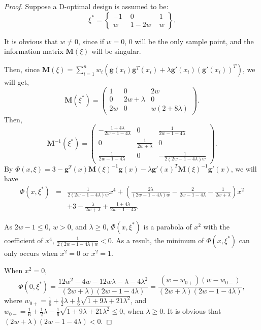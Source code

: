 \documentclass[preprint,12pt]{elsarticle}
\begin{document}
\begin{proof}
Suppose a D-optimal design is assumed to be:
$$\xi^*=\left\{\begin{array}{ccc}-1\,\,&0\,\,&1\\w\,\,&1-2w\,\,&w\end{array}\right\}.$$

It is obvious that $w\neq0$, since if $w=0$, $0$ will be the only
sample point, and the information matrix $\boldsymbol{M}(\xi)$ will
be singular.

Then, since
$\boldsymbol{M}(\xi)=\sum\limits_{i=1}^nw_i\left(\boldsymbol{g}(x_i)\boldsymbol{g}^T(x_i)+\lambda\boldsymbol{g}'(x_i)
\left(\boldsymbol{g}'(x_i)\right)^T\right)$, we will get,
$$\boldsymbol{M}(\xi^*)=\left(\begin{array}{ccc}1&0&2w\\0&2w+\lambda&0\\2w&0&w(2+8\lambda
)\end{array}\right).$$ Then,
$$\boldsymbol{M}^{-1}(\xi^*)=\left(\begin{array}{ccc}-\frac{1+4\lambda}{2w-1-4\lambda}&0&\frac{1}{2w-1-4\lambda}\\0&\frac{1}{2w+\lambda}&0\\\frac{1}{2w-1-4\lambda}&0&-\frac{1}{2(2w-1-4\lambda)w}\end{array}\right).$$
By
$\Phi(x,\xi)=3-\boldsymbol{g}^T(x)\boldsymbol{M}(\xi)^{-1}\boldsymbol{g}(x)-\lambda\boldsymbol{g}'(x)^T\boldsymbol{M}(\xi)^{-1}\boldsymbol{g}'(x)$,
we will have
\begin{eqnarray*}
\Phi(x,\xi^*)&=&\frac{1}{2(2w-1-4\lambda)w}x^4+\left(\frac{2\lambda}{(2w-1-4\lambda)w}-\frac{2}{2w-1-4\lambda}-\frac{1}{2w+\lambda}\right)x^2\\
&&+3-\frac{\lambda}{2w+\lambda}+\frac{1+4\lambda}{2w-1-4\lambda}.
\end{eqnarray*}

As $2w-1\leq0$, $w>0$, and $\lambda\geq0$, $\Phi(x,\xi^*)$ is a
parabola of $x^2$ with the coefficient of $x^4$,
$\frac{1}{2(2w-1-4\lambda)w}<0$. As a result, the minimum of
$\Phi(x,\xi^*)$ can only occurs when $x^2=0$ or $x^2=1$.

When $x^2=0$,
$$\Phi(0,\xi^*)=\frac{12w^2-4w-12w\lambda-\lambda-4\lambda^2}{(2w+\lambda)(2w-1-4\lambda)}=\frac{(w-w_{0+})(w-w_{0-})}{(2w+\lambda)(2w-1-4\lambda)},$$
where
$w_{0+}=\frac{1}{6}+\frac{1}{2}\lambda+\frac{1}{6}\sqrt{1+9\lambda+21\lambda^2}$,
and
$w_{0-}=\frac{1}{6}+\frac{1}{2}\lambda-\frac{1}{6}\sqrt{1+9\lambda+21\lambda^2}\leq0$,
when $\lambda\geq0$. It is obvious that
$(2w+\lambda)(2w-1-4\lambda)<0$.


\end{proof}
\end{document}
